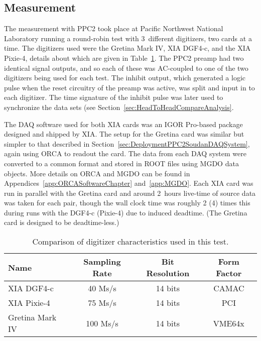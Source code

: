		\subsection{Measurement}
	     	\label{sec:HeadToHeadCompareMeasurement}     
	The measurement with PPC2 took place at Pacific Northwest National Laboratory running a round-robin test with 3~different digitizers, two cards at a time.  The digitizers used were the Gretina Mark IV, XIA DGF4-c, and the XIA Pixie-4, details about which are given in Table~\ref{tab:HeadToHeadComparisonDetectorChars}.  The PPC2 preamp had two identical signal outputs, and so each of these was AC-coupled to one of the two digitizers being used for each test.  The inhibit output, which generated a logic pulse when the reset circuitry of the preamp was active, was split and input in to each digitizer.  The time signature of the inhibit pulse was later used to synchronize the data sets (see Section~\ref{sec:HeadToHeadCompareAnalysis}.  
	
	The DAQ software used for both XIA cards was an IGOR Pro-based package designed and shipped by XIA.  	The setup for the Gretina card was similar but simpler to that described in Section~\ref{sec:DeploymentPPC2SoudanDAQSystem}, again using ORCA to readout the card.  The data from each DAQ system were converted to a common format and stored in ROOT files using MGDO data objects.  More details on ORCA and MGDO can be found in Appendices~\ref{app:ORCASoftwareChapter} and~\ref{app:MGDO}.  Each XIA card was run in parallel with the Gretina card and around 2~hours live-time of source data was taken for each pair, though the wall clock time was roughly 2 (4) times this during runs with the DGF4-c (Pixie-4) due to induced deadtime.  (The Gretina card is designed to be deadtime-less.)  
		
			\begin{table}
				\centering
				\begin{tabular}{l|c|c|c}
					Name & Sampling Rate & Bit Resolution & Form Factor \\
					\hline
					XIA DGF4-c & 40 Ms/s & 14 bits & CAMAC \\
					\hline
					XIA Pixie-4 &  75 Ms/s & 14 bits & PCI \\
					\hline
					Gretina Mark IV &  100 Ms/s & 14 bits & VME64x \\										
					\hline					
				\end{tabular}
				\caption[Comparison of digitizer characteristics]
				{Comparison of digitizer characteristics used in this test.}
				\label{tab:HeadToHeadComparisonDetectorChars}
			\end{table}	
		
